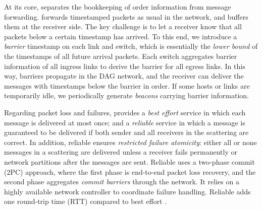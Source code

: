 At its core, \sys separates the bookkeeping of order information from message forwarding.
\sys forwards timestamped packets as usual in the network, and buffers them at the receiver side.
The key challenge is to let a receiver know that all packets below a certain timestamp has arrived.
To this end, we introduce a \emph{barrier} timestamp on each link and switch, which is essentially the \emph{lower bound} of the timestamps of all future arrival packets.
Each switch aggregates barrier information of all ingress links to derive the barrier for all egress links.
In this way, barriers propagate in the DAG network, and the receiver can deliver the messages with timestamps below the barrier in order.
If some hosts or links are temporarily idle, we periodically generate \emph{beacons} carrying barrier information.

Regarding packet loss and failures, \sys{} provides a \emph{best effort} service in which each message is delivered at most once; and a \emph{reliable} service in which a message is guaranteed to be delivered if both sender and all receivers in the scattering are correct.
In addition, reliable \sys{} ensures \emph{restricted failure atomicity}: either all or none messages in a scattering are delivered unless a receiver fails permanently or network partitions after the messages are sent.
Reliable \sys{} uses a two-phase commit (2PC) approach, where the first phase is end-to-end packet loss recovery, and the second phase aggregates \emph{commit barriers} through the network.
It relies on a highly available network controller to coordinate failure handling.
Reliable \sys{} adds one round-trip time (RTT) compared to best effort \sys{}.

